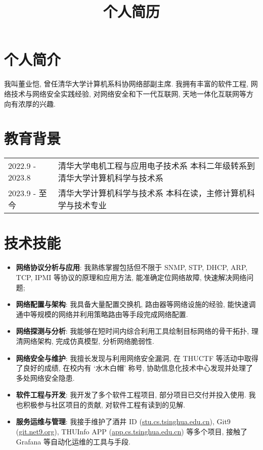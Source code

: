 \documentclass[a4paper, 10pt]{article}
\title{个人简历}
\date{}
\begin{document}
\maketitle
\vspace{-2em}

\section*{个人简介}
我叫董业恺, 曾任清华大学计算机系科协网络部副主席. 我拥有丰富的软件工程, 网络技术与网络安全实践经验, 对网络安全和下一代互联网, 天地一体化互联网等方向有浓厚的兴趣.

\section*{教育背景}
\noindent
\begin{tabular}{p{}p{}}
    2022.9 - 2023.8 & 清华大学电机工程与应用电子技术系 \newline
        \fontsize{8pt}{10pt}\selectfont 本科二年级转系到清华大学计算机科学与技术系 \\

    2023.9 - 至今 & 清华大学计算机科学与技术系 \newline
        \fontsize{8pt}{10pt}\selectfont 本科在读，主修计算机科学与技术专业 \\
\end{tabular}

\section*{技术技能}
\begin{itemize}[left=0pt]
    \item \textbf{网络协议分析与应用}: 我熟练掌握包括但不限于 SNMP, STP, DHCP, ARP, TCP, IPMI 等协议的原理和应用方法, 能准确定位网络故障, 快速解决网络问题;
    \item \textbf{网络配置与架构}: 我具备大量配置交换机, 路由器等网络设施的经验, 能快速调通中等规模的网络并利用策略路由等手段完成网络配置.
    \item \textbf{网络探测与分析}: 我能够在短时间内综合利用工具绘制目标网络的骨干拓扑, 理清网络架构, 完成仿真模型, 分析网络脆弱性.
    \item \textbf{网络安全与维护}: 我擅长发现与利用网络安全漏洞, 在 THUCTF 等活动中取得了良好的成绩, 在校内有 `水木白帽' 称号, 协助信息化技术中心发现并处理了多处网络安全隐患.
    \item \textbf{软件工程与开发}: 我开发了多个软件工程项目, 部分项目已交付并投入使用. 我也积极参与社区项目的贡献, 对软件工程有读到的见解.
    \item \textbf{服务运维与管理}: 我接手维护了酒井 ID (\href{https://stu.cs.tsinghua.edu.cn}{stu.cs.tsinghua.edu.cn}), Git9 (\href{https://git.net9.org}{git.net9.org}), THUInfo APP (\href{https://app.cs.tsinghua.edu.cn}{app.cs.tsinghua.edu.cn}) 等多个项目, 接触了 Grafana 等自动化运维的工具与手段.
\end{itemize}
\end{document}
